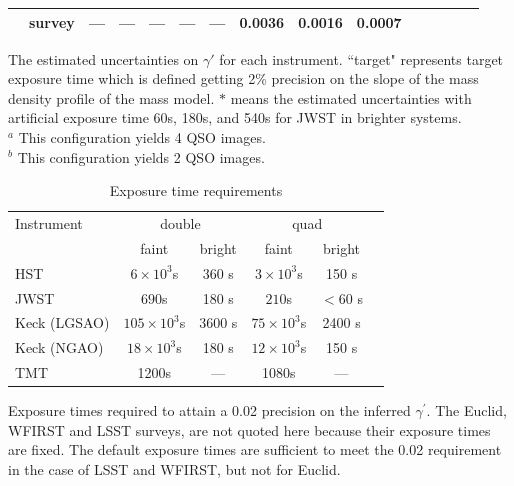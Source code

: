 \documentclass[a4paper,11pt]{article}
\begin{document}
\begin{table}
\begin{center}
\begin{tabular}{lcccccccccccccc|}
&                                        survey & ---     & ---               & ---       & ---     & ---  & 0.0036 & 0.0016 & 0.0007\\
\hline \hline
\end{tabular}
\begin{tablenotes}
\item
The estimated uncertainties on $\gamma'$ for each instrument.
``target" represents target exposure time which is defined getting 2\% precision on the slope of the mass density profile of the mass model. $*$ means the estimated uncertainties with artificial exposure time 60s, 180s, and 540s for JWST in brighter systems.\\
$^a$ This configuration yields 4 QSO images. \\
$^b$ This configuration yields 2 QSO images. \\
\label{tab:estimated_uncertainties}
\end{tablenotes}
\end{center}
\end{table}

\begin{table}\footnotesize
\begin{center}
\caption{Exposure time requirements}
\begin{tabular}{lccccc|}
\hline \hline
Instrument & \multicolumn{2}{c}{double} & \multicolumn{2}{c}{quad} \\
  & faint  & bright &  faint  &  bright \\
\hline
  HST   & $6\times10^3$s & 360 s  & $3\times10^3$s & 150 s \\
  JWST   & $690$s & 180 s  & $210$s & $<$60 s \\
  Keck (LGSAO)   & $105\times10^3$s & 3600 s  & $75\times10^3$s & 2400 s \\
  Keck (NGAO)   & $18\times10^3$s & 180 s  & $12\times10^3$s & 150 s \\
  TMT   &  1200s  &  ---   &   1080s   &  ---  \\
\hline
\hline
\end{tabular}
\begin{tablenotes}
\item
Exposure times required to attain a 0.02 precision on the inferred $\gamma^\prime.$
 The Euclid, WFIRST and LSST surveys, are not quoted here because their exposure times are fixed. The default exposure times are sufficient to meet the 0.02 requirement in the case of LSST and WFIRST, but not for Euclid.\\
\end{tablenotes}
\label{tab:exptimes}
\end{center}
\end{table}
\end{document}
